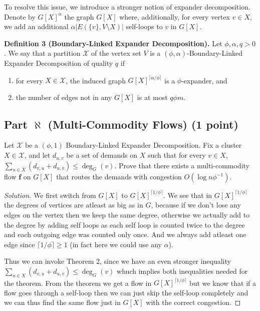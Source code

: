 \documentclass[a4paper,11pt]{article}
\DeclareMathOperator{\degG}{deg}
\renewcommand{\deg}{\degG} %
\newenvironment{solution}
  {\begin{proof}[Solution]}
  {\end{proof}}
\begin{document}
To resolve this issue, we introduce a stronger notion of expander decomposition. Denote by \(G[X]^{\alpha}\) the graph \(G[X]\) where, additionally, for every vertex \(v\in X\), we add an additional \(\alpha |E(\{v\},V\setminus X)|\) self-loops to \(v\) in \(G[X]\).

\textbf{Definition 3 (Boundary-Linked Expander Decomposition).} Let \(\phi,\alpha,q > 0\). We say that a partition \(\mathcal{X}\) of the vertex set \(V\) is a \((\phi,\alpha)\)-Boundary-Linked Expander Decomposition of quality \(q\) if
\begin{enumerate}[label=(\arabic*)]
    \item for every \(X\in \mathcal{X}\), the induced graph \(G[X]^{\lceil \alpha/\phi \rceil}\) is a \(\phi\)-expander, and
    \item the number of edges not in any \(G[X]\) is at most \(q\phi m\).
\end{enumerate}

\subsection*{Part \(\aleph\) (Multi-Commodity Flows) (1 point)}
Let \(\mathcal{X}\) be a \((\phi,1)\) Boundary-Linked Expander Decomposition. Fix a cluster \(X\in \mathcal{X}\), and let \(d_{u,v}\) be a set of demands on \(X\) such that for every \(v\in X\), \(\sum_{u\in X}(d_{v,u} + d_{u,v})\leq \deg_G(v)\). Prove that there exists a multi-commodity flow \(\pmb{f}\) on \(G[X]\) that routes the demands with congestion \(O(\log n \phi^{-1})\).



\begin{solution}

We first switch from $G[X]$ to $G[X]^{\lceil 1/\phi \rceil}$.
We see that in $G[X]^{\lceil 1/\phi \rceil}$ the degrees of vertices are atleast as big as in $G$, because if we don't lose any edges on the vertex then we keep the same degree, otherwise we actually add to the degree by adding self loops as each self loop is counted twice to the degree and each outgoing edge was counted only once. And we always add atleast one edge since $\lceil 1/\phi \rceil\geq 1$ (in fact here we could use any $\alpha$).

Thus we can invoke Theorem 2, since we have an even stronger inequality \(\sum_{u\in X}(d_{v,u} + d_{u,v})\leq \deg_G(v)\) whuch implies both inequalities needed for the theorem. From the theorem we get a flow in $G[X]^{\lceil 1/\phi \rceil}$ but we know that if a flow goes through a self-loop then we can just skip the self-loop completely and we can thus find the same flow just in $G[X]$ with the correct congestion.
\end{solution}
\end{document}
